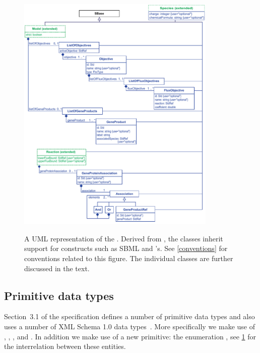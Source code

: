\begin{figure}[ht!]
  \centering
  \includegraphics[width=0.85\textwidth]{images/v3harmony_fbc_uml.pdf}\\
  \caption{A UML representation of the \FBCPackage. Derived from \SBase, the
	\FBC classes inherit support for constructs such as SBML \Notes and
	\Annotation's. See \ref{conventions} for conventions related to this figure.
	The individual classes are further discussed in the text.}
  \label{fig:fbc_uml}
\end{figure}

\subsection{Primitive data types}
\label{primtypes}

Section~3.1 of the \sbmlthreecore specification defines a number of primitive
data types and also uses a number of XML Schema 1.0 data types~\citep{biron:2000}.
More specifically we make use of , ,
,  and . In addition we make
use of a new primitive: the enumeration , see \ref{fig:fbc_uml}
for the interrelation between
these entities.

